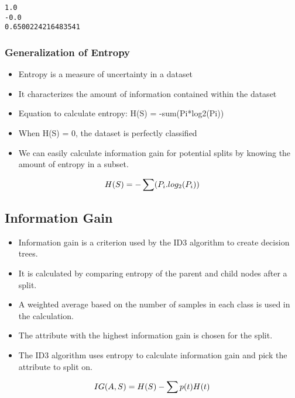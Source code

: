 \documentclass[11pt]{article}
\providecommand{\tightlist}{%
      \setlength{\itemsep}{0pt}\setlength{\parskip}{0pt}}
\begin{document}
    \begin{Verbatim}[commandchars=\\\{\}]
1.0
-0.0
0.6500224216483541
    \end{Verbatim}

    \hypertarget{generalization-of-entropy}{%
\subsubsection{Generalization of
Entropy}\label{generalization-of-entropy}}

\begin{itemize}
\tightlist
\item
  Entropy is a measure of uncertainty in a dataset
\item
  It characterizes the amount of information contained within the
  dataset
\item
  Equation to calculate entropy: H(S) = -sum(Pi*log2(Pi))
\item
  When H(S) = 0, the dataset is perfectly classified
\item
  We can easily calculate information gain for potential splits by
  knowing the amount of entropy in a subset.
\end{itemize}

\[\large H(S) = -\sum (P_i . log_2(P_i))\]

\hypertarget{information-gain}{%
\subsection{Information Gain}\label{information-gain}}

\begin{itemize}
\tightlist
\item
  Information gain is a criterion used by the ID3 algorithm to create
  decision trees.
\item
  It is calculated by comparing entropy of the parent and child nodes
  after a split.
\item
  A weighted average based on the number of samples in each class is
  used in the calculation.
\item
  The attribute with the highest information gain is chosen for the
  split.
\item
  The ID3 algorithm uses entropy to calculate information gain and pick
  the attribute to split on.
\end{itemize}

\[\large IG(A, S) = H(S) - \sum{}{p(t)H(t)}  \]
\end{document}
